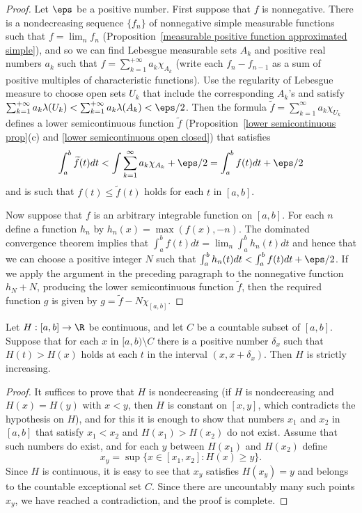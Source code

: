 \begin{proof}
Let $\eps$ be a positive number. First suppose that $f$ is nonnegative. There is a nondecreasing sequence $\{f_n\}$ of nonnegative simple measurable functions such that $f=\lim_nf_n$ (Proposition~\ref{measurable positive function approximated simple}), and so we can find Lebesgue measurable sets $A_k$ and positive real numbers $a_k$ such that $f=\sum_{k=1}^{+\infty}a_k\chi_{A_k}$ (write each $f_n-f_{n-1}$ as a sum of positive multiples of characteristic functions). Use the regularity of Lebesgue measure to choose open sets $U_k$ that include the corresponding $A_k$'s and satisfy $\sum_{k=1}^{+\infty}a_k\lambda(U_k)<\sum_{k=1}^{+\infty}a_k\lambda(A_k)<\eps/2$. Then the formula $\widetilde{f}=\sum_{k=1}^{\infty}a_k\chi_{U_k}$ defines a lower semicontinuous function $\widetilde{f}$ (Proposition~\ref{lower semicontinuous prop}(c) and \ref{lower semicontinuous open closed}) that satisfies
\[\int_a^b\widetilde{f}(t)dt<\int\sum_{k=1}^{\infty}a_k\chi_{A_k}+\eps/2=\int_a^bf(t)dt+\eps/2\]
and is such that $f(t)\leq\widetilde{f}(t)$ holds for each $t$ in $[a,b]$.\par
Now suppose that $f$ is an arbitrary integrable function on $[a,b]$. For each $n$ define a function $h_n$ by $h_n(x)=\max(f(x),-n)$. The dominated convergence theorem implies that $\int_a^bf(t)dt=\lim_n\int_a^bh_n(t)dt$ and hence that we can choose a positive integer $N$ such that $\int_a^bh_n(t)dt<\int_a^bf(t)dt+\eps/2$. If we apply the argument in the preceding paragraph to the nonnegative function $h_N+N$, producing the lower semicontinuous function $\widetilde{f}$, then the required function $g$ is given by $g=\widetilde{f}-N\chi_{[a,b]}$.
\end{proof}
\begin{lemma}\label{continuous increase except countable}
Let $H:[a,b]\to\R$ be continuous, and let $C$ be a countable subset of $[a,b]$. Suppose that for each $x$ in $[a,b)\setminus C$ there is a positive number $\delta_x$ such that $H(t)>H(x)$ holds at each $t$ in the interval $(x,x+\delta_x)$. Then $H$ is strictly increasing.
\end{lemma}
\begin{proof}
It suffices to prove that $H$ is nondecreasing (if $H$ is nondecreasing and $H(x)=H(y)$ with $x<y$, then $H$ is constant on $[x,y]$, which contradicts the hypothesis on $H$), and for this it is enough to show that numbers $x_1$ and $x_2$ in $[a,b]$ that satisfy $x_1<x_2$ and $H(x_1)>H(x_2)$ do not exist. Assume that such numbers do exist, and for each $y$ between $H(x_1)$ and $H(x_2)$ define
\[x_y=\sup\{x\in[x_1,x_2]:H(x)\geq y\}.\]
Since $H$ is continuous, it is easy to see that $x_y$ satisfies $H(x_y)=y$ and belongs to the countable exceptional set $C$. Since there are uncountably many such points $x_y$, we have reached a contradiction, and the proof is complete.
\end{proof}
